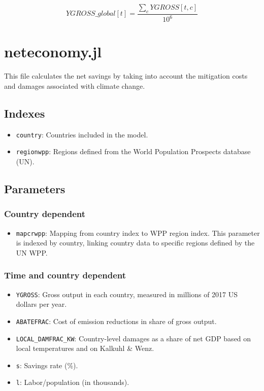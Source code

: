 \documentclass[
]{article}
\providecommand{\tightlist}{%
  \setlength{\itemsep}{0pt}\setlength{\parskip}{0pt}}
\begin{document}
\begin{equation}
 YGROSS\_global[t] = \frac{\sum_{c} YGROSS[t,c]}{10^6}
\end{equation}


\section{neteconomy.jl}\label{neteconomy.jl}

This file calculates the net savings by taking into account the
mitigation costs and damages associated with climate change.

\subsection{Indexes}\label{indexes-3}

\begin{itemize}
\tightlist
\item
  \texttt{country}: Countries included in the model.
\item
  \texttt{regionwpp}: Regions defined from the World Population Prospects database (UN).
\end{itemize}

\subsection{Parameters}\label{parameters-4}

\subsubsection{Country dependent}\label{country-dependent-2}

\begin{itemize}
\tightlist
\item
  \texttt{mapcrwpp}: Mapping from country index to WPP region index.
  This parameter is indexed by country, linking country data to specific
  regions defined by the UN WPP.
\end{itemize}

\subsubsection{Time and country
dependent}\label{time-and-country-dependent-8}

\begin{itemize}
\item
  \texttt{YGROSS}: Gross output in each country, measured in millions of
  2017 US dollars per year.
\item
  \texttt{ABATEFRAC}: Cost of emission reductions in share of gross
  output.
\item
  \texttt{LOCAL\_DAMFRAC\_KW}: Country-level damages as a share of net
  GDP based on local temperatures and on Kalkuhl \& Wenz.
\item
  \texttt{s}: Savings rate (\%).
\item
  \texttt{l}: Labor/population (in thousands).
\end{itemize}
\end{document}
